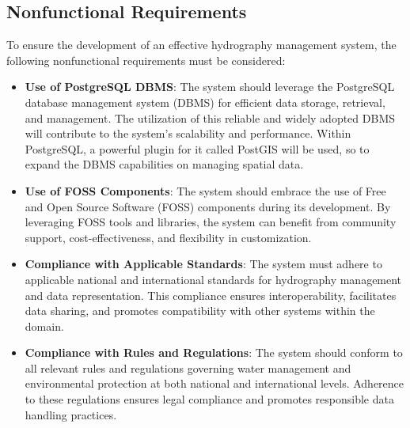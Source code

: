 \subsection{Nonfunctional Requirements}
To ensure the development of an effective hydrography management system, the following nonfunctional requirements must be considered:
\begin{itemize}
    \item \textbf{Use of PostgreSQL DBMS}: The system should leverage the PostgreSQL database management system (DBMS) for efficient data storage, retrieval, and management. The utilization of this reliable and widely adopted DBMS will contribute to the system's scalability and performance. Within PostgreSQL, a powerful plugin for it called PostGIS will be used, so to expand the DBMS capabilities on managing spatial data.
    \item \textbf{Use of FOSS Components}: The system should embrace the use of Free and Open Source Software (FOSS) components during its development. By leveraging FOSS tools and libraries, the system can benefit from community support, cost-effectiveness, and flexibility in customization.
    \item \textbf{Compliance with Applicable Standards}: The system must adhere to applicable national and international standards for hydrography management and data representation. This compliance ensures interoperability, facilitates data sharing, and promotes compatibility with other systems within the domain.
    \item \textbf{Compliance with Rules and Regulations}: The system should conform to all relevant rules and regulations governing water management and environmental protection at both national and international levels. Adherence to these regulations ensures legal compliance and promotes responsible data handling practices.
\end{itemize}

